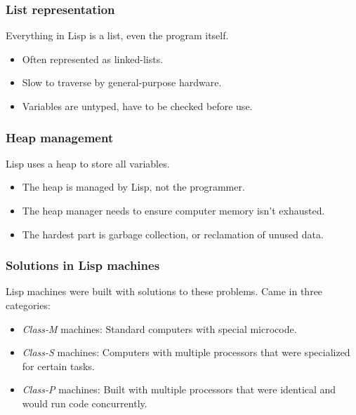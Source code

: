 \documentclass{beamer}
\begin{document}
\begin{frame}
	\frametitle{List representation}
	Everything in Lisp is a list, even the program itself.
	\newline
	\begin{itemize}
		\item Often represented as linked-lists.
		\newline
		\item Slow to traverse by general-purpose hardware.
		\newline
		\item Variables are untyped, have to be checked before use.
	\end{itemize}
\end{frame}

\begin{frame}
	\frametitle{Heap management}
	Lisp uses a heap to store all variables.
	\newline
	\begin{itemize}
		\item The heap is managed by Lisp, not the programmer.
		\newline
		\item The heap manager needs to ensure computer memory isn't exhausted.
		\newline
		\item The hardest part is garbage collection, or reclamation of unused data.
	\end{itemize}
\end{frame}

\begin{frame}
	\frametitle{Solutions in Lisp machines}
	Lisp machines were built with solutions to these problems. Came in three categories:
	\newline
	\begin{itemize}
		\item \emph{Class-M} machines: Standard computers with special microcode.
		\newline
		\item \emph{Class-S} machines: Computers with multiple processors that were specialized for certain tasks.
		\newline
		\item \emph{Class-P} machines: Built with multiple processors that were identical and would run code concurrently.
	\end{itemize}
\end{frame}
\end{document}

